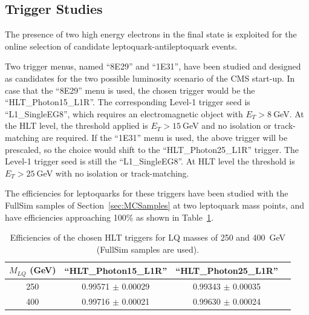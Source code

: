 \documentclass{cmspaper}
\begin{document}
\begin{linenumbers}
\section{Trigger Studies} \label{sec:trig}

The presence of two high energy electrons in the final state is exploited for the online selection 
of candidate leptoquark-antileptoquark events.

Two trigger menus, named ``8E29'' and ``1E31'', have been studied and designed as candidates for 
the two possible luminosity scenario of the CMS start-up.
In case that the ``8E29'' menu is used, the chosen trigger would be the ``HLT\_Photon15\_L1R''.
The corresponding Level-1 trigger seed is ``L1\_SingleEG8'', which requires an electromagnetic object with 
$E_T>8~$GeV. At the HLT level, the threshold applied is $E_T>15~$GeV and no isolation or track-matching
are required.
If the ``1E31'' menu is used, the above trigger will be prescaled, so the choice would shift to the
``HLT\_Photon25\_L1R'' trigger. The Level-1 trigger seed is still the ``L1\_SingleEG8''. At HLT level the 
threshold is $E_T>25~$GeV with no isolation or track-matching.

The efficiencies for leptoquarks for these triggers have been studied with the FullSim 
samples of Section~\ref{sec:MCSamples} at two leptoquark mass points, and have efficiencies approaching
100\% as shown in Table~\ref{tab:HLTEffic}.

\begin{table}[htbp]
\begin{center}
\begin{tabular}{|c|c|c|c|}
\hline\hline
 $M_{LQ}$ (GeV)     &   ``HLT\_Photon15\_L1R''   &   ``HLT\_Photon25\_L1R'' \\
\hline\hline
250                 & 0.99571  $\pm$ 0.00029     & 0.99343  $\pm$ 0.00035   \\
400                 & 0.99716  $\pm$ 0.00021     & 0.99630  $\pm$ 0.00024   \\
\hline\hline
\end{tabular}
\end{center}
\caption{Efficiencies of the chosen HLT triggers for LQ masses of 250 and 400~GeV (FullSim samples are used).}
\label{tab:HLTEffic}
\end{table}


\end{linenumbers}
\end{document}
